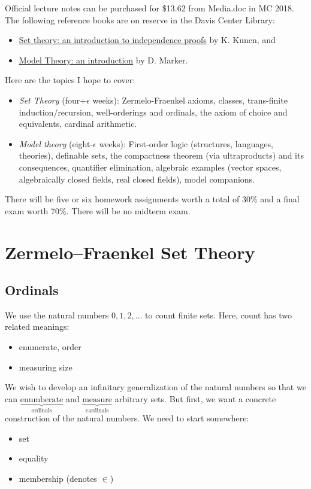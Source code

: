 \documentclass[11pt]{article}
\theoremstyle{theorem}
\begin{document}
\begin{titlepage}
Official lecture notes can be purchased for \$13.62 from Media.doc in MC 2018.
The following reference books are on reserve in the Davis Center Library:
\begin{itemize}
	\item \underline{Set theory: an introduction to independence proofs} by
		K. Kunen, and
	\item \underline{Model Theory: an introduction} by D. Marker.
\end{itemize}
Here are the topics I hope to cover:
\begin{itemize}
	\item {\it Set Theory} (four+$\epsilon$ weeks): Zermelo-Fraenkel axioms,
		classes, trans-finite induction/recursion, well-orderings and ordinals,
		the axiom of choice and equivalents, cardinal arithmetic.
	\item {\it Model theory} (eight-$\epsilon$ weeks): First-order logic
		(structures, languages, theories), definable sets, the compactness
		theorem (via ultraproducts) and its consequences, quantifier
		elimination, algebraic examples (vector spaces, algebraically closed
		fields, real closed fields), model companions.
\end{itemize}
There will be five or six homework assignments worth a total of 30\% and a final
exam worth 70\%. There will be no midterm exam.

\pagebreak
\section{Zermelo–Fraenkel Set Theory}
\subsection{Ordinals}
We use the natural numbers $0,1,2,\dots$ to count finite sets. Here, count has
two related meanings:

\begin{itemize}
	\item enumerate, order
	\item measuring size
\end{itemize}

We wish to develop an infinitary generalization of the natural numbers so that
we can $\underbrace{\text{enumberate}}_{\text{ordinals}}$ and
$\underbrace{\text{measure}}_{\text{cardinals}}$ arbitrary sets. But first, we
want a concrete construction of the natural numbers. We need to start somewhere:

\begin{itemize}
	\item set
	\item equality
	\item membership (denotes $\in$)
\end{itemize}


\end{titlepage}
\end{document}
